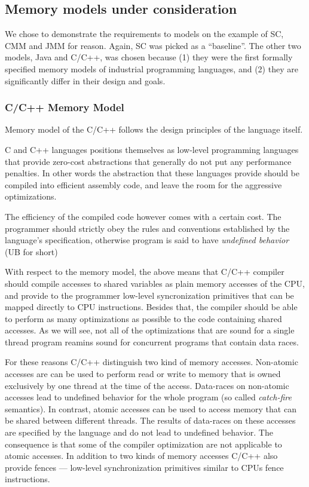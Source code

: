 \documentclass[a4paper,twoside,11pt]{article}
\numberwithin{equation}{section}
\begin{document}
\subsection{Memory models under consideration}

We chose to demonstrate the requirements to models on the example of SC, CMM and JMM for reason.
Again, SC was picked as a ``baseline''.
The other two models, Java and C/C++, was chosen because 
(1) they were the first formally specified memory models of industrial programming languages, and
(2) they are significantly differ in their design and goals.

\subsubsection{C/C++ Memory Model}

Memory model of the C/C++ follows the design principles of the language itself.

C and C++ languages positions themselves as low-level programming languages
that provide zero-cost abstractions that generally do not put any performance penalties. 
In other words the abstraction that these languages provide 
should be compiled into efficient assembly code,
and leave the room for the aggressive optimizations.

The efficiency of the compiled code however comes with a certain cost.
The programmer should strictly obey the rules and conventions
established by the language's specification, 
otherwise program is said to have \emph{undefined behavior} (UB for short)

With respect to the memory model, the above means that C/C++ compiler should
compile accesses to shared variables as plain memory accesses of the CPU,
and provide to the programmer low-level syncronization primitives
that can be mapped directly to CPU instructions.
Besides that, the compiler should be able to perform 
as many optimizations as possible to the code containing shared accesses.
As we will see, not all of the optimizations that are sound 
for a single thread program reamins sound for concurrent programs that contain data races. 

For these reasons C/C++ distinguish two kind of memory accesses.
Non-atomic accesses are can be used to perform read or write to memory that 
is owned exclusively by one thread at the time of the access.
Data-races on non-atomic accesses lead to undefined behavior for the whole program
(so called \emph{catch-fire} semantics).
In contrast, atomic accesses can be used to access memory that can be shared between different threads. 
The results of data-races on these accesses are specified by the language and do not lead to undefined behavior.
The consequence is that some of the compiler optimization are not applicable to atomic accesses.
In addition to two kinds of memory accesses C/C++ also provide fences ---
low-level synchronization primitives similar to CPUs fence instructions.
\end{document}
